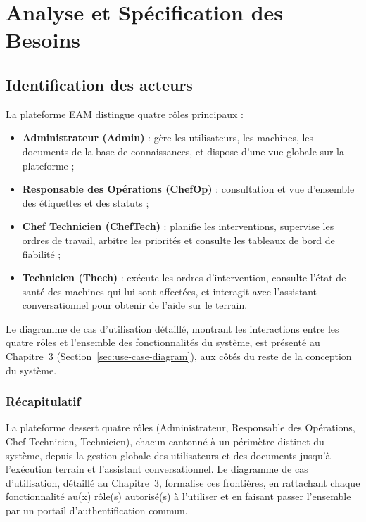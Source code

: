\chapter{Analyse et Spécification des Besoins}

\section{Identification des acteurs}

La plateforme EAM distingue quatre rôles principaux :
\begin{itemize}
\item \textbf{Administrateur (Admin)} : gère les utilisateurs, les machines, les documents de la base de connaissances, et dispose d'une vue globale sur la plateforme ;
\item \textbf{Responsable des Opérations (ChefOp)} : consultation et vue d'ensemble des étiquettes et des statuts ;
\item \textbf{Chef Technicien (ChefTech)} : planifie les interventions, supervise les ordres de travail, arbitre les priorités et consulte les tableaux de bord de fiabilité ;
\item \textbf{Technicien (Thech)} : exécute les ordres d'intervention, consulte l'état de santé des machines qui lui sont affectées, et interagit avec l'assistant conversationnel pour obtenir de l'aide sur le terrain.
\end{itemize}

\noindent
Le diagramme de cas d'utilisation détaillé, montrant les interactions entre les quatre rôles et l'ensemble des fonctionnalités du système, est présenté au Chapitre~3 (Section~\ref{sec:use-case-diagram}), aux côtés du reste de la conception du système.

\subsection{Récapitulatif}

La plateforme dessert quatre rôles (Administrateur, Responsable des Opérations, Chef Technicien, Technicien), chacun cantonné à un périmètre distinct du système, depuis la gestion globale des utilisateurs et des documents jusqu'à l'exécution terrain et l'assistant conversationnel. Le diagramme de cas d'utilisation, détaillé au Chapitre~3, formalise ces frontières, en rattachant chaque fonctionnalité au(x) rôle(s) autorisé(s) à l'utiliser et en faisant passer l'ensemble par un portail d'authentification commun.

